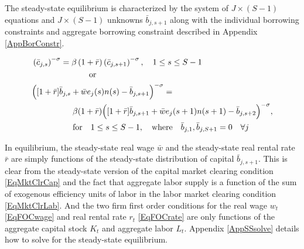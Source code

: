 \documentclass[letterpaper,12pt]{article}
\theoremstyle{definition}
\begin{document}
\begin{spacing}{1.5}
    The steady-state equilibrium is characterized by the system of $J\times(S-1)$ equations and $J\times(S-1)$ unknowns $\bar{b}_{j,s+1}$ along with the individual borrowing constraints and aggregate borrowing constraint described in Appendix \ref{AppBorConstr}.

    \begin{equation}\label{EqSSeuler}
      \begin{split}
        &\left(\bar{c}_{j,s}\right)^{-\sigma} = \beta \left(1+\bar{r}\right)\left(\bar{c}_{j,s+1}\right)^{-\sigma}, \quad 1\leq s\leq S-1 \\
        &\quad\quad\quad\quad\quad\quad\quad\text{or} \\
        &\Bigl([1+\bar{r}]\bar{b}_{j,s} + \bar{w}e_j(s)n(s) - \bar{b}_{j,s+1}\Bigr)^{-\sigma} = \\
        &\quad\quad\quad\quad\quad \beta(1+\bar{r})\Bigl([1+\bar{r}]\bar{b}_{j,s+1} + \bar{w}e_j(s+1)n(s+1) - \bar{b}_{j,s+2}\Bigr)^{-\sigma}, \\
        &\quad\quad\quad\quad\quad \text{for} \quad 1\leq s\leq S-1,\quad\text{where}\quad \bar{b}_{j,1},\bar{b}_{j,S+1} = 0 \quad\forall j
      \end{split}
    \end{equation}

    In equilibrium, the steady-state real wage $\bar{w}$ and the steady-state real rental rate $\bar{r}$ are simply functions of the steady-state distribution of capital $\bar{b}_{j,s+1}$. This is clear from the steady-state version of the capital market clearing condition \eqref{EqMktClrCap} and the fact that aggregate labor supply is a function of the sum of exogenous efficiency units of labor in the labor market clearing condition \eqref{EqMktClrLab}. And the two firm first order conditions for the real wage $w_t$ \eqref{EqFOCwage} and real rental rate $r_t$ \eqref{EqFOCrate} are only functions of the aggregate capital stock $K_t$ and aggregate labor $L_t$. Appendix \ref{AppSSsolve} details how to solve for the steady-state equilibrium.


\end{spacing}
\end{document}
